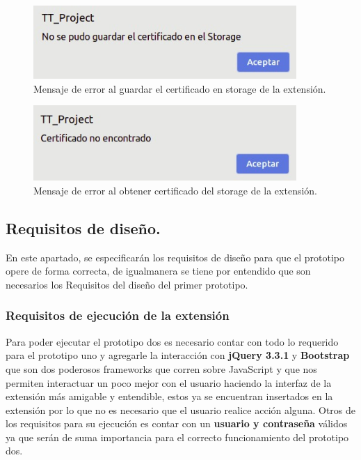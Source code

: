 \documentclass[12pt, a4paper, titlepage]{report}
\begin{document}
    			\begin{figure}[H]
    				\begin{center}	\includegraphics[width=10cm]{./imagenes/Desarrollo/Prototipo_2/UI_certNotSavedInStorage.jpeg}
    					\caption[Mensaje de error]{Mensaje de error al guardar el certificado en storage de la extensión.}
    				\end{center}
    			\end{figure}
    			\label{UI_certNotSavedInStorage}
    			
    			\begin{figure}[H]
    				\begin{center}	\includegraphics[width=10cm]{./imagenes/Desarrollo/Prototipo_2/UI_certNotFound.jpeg}
    					\caption[Mensaje de error en certificado]{Mensaje de error al obtener certificado del storage de la extensión.}
    				\end{center}
    			\end{figure}
    			\label{UI_certNotFound}
			
    	    \subsection{Requisitos de diseño.}
    			   En este apartado, se especificarán los requisitos de diseño para que el prototipo opere de forma correcta, de igualmanera se tiene por entendido que son necesarios los Requisitos del diseño del primer prototipo.
    			   \subsubsection{Requisitos de ejecución de la extensi\'on}
    			        Para poder ejecutar el prototipo dos es necesario contar con todo lo requerido para el prototipo uno y agregarle la interacci\'on con \textbf{jQuery 3.3.1 } y \textbf{Bootstrap} que son dos poderosos frameworks que corren sobre JavaScript y que nos permiten interactuar un poco mejor con el usuario haciendo la interfaz de la extensi\'on más amigable y entendible, estos ya se encuentran insertados en la extensión por lo que no es necesario que el usuario realice acción alguna.
    			        Otros de los requisitos para su ejecución es contar con un \textbf{usuario y contraseña} válidos ya que ser\'an de suma importancia para el correcto funcionamiento del prototipo dos.
\end{document}
